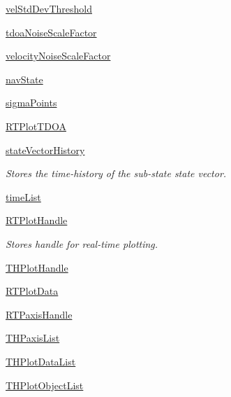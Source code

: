 \begin{DoxyCompactItemize}
\hyperlink{classmodest_1_1substates_1_1correlationvector_1_1CorrelationVector_a2a0c78f9d00f305e6143fb8fbf73fc2f}{vel\+Std\+Dev\+Threshold}
\item 
\hyperlink{classmodest_1_1substates_1_1correlationvector_1_1CorrelationVector_a733786d20ee5e03a7c28420b5db01dcb}{tdoa\+Noise\+Scale\+Factor}
\item 
\hyperlink{classmodest_1_1substates_1_1correlationvector_1_1CorrelationVector_a9f6b81403f3e0c73de3b5b721ca673e5}{velocity\+Noise\+Scale\+Factor}
\item 
\hyperlink{classmodest_1_1substates_1_1correlationvector_1_1CorrelationVector_a29c9276a6e6569fc4a48270f05138148}{nav\+State}
\item 
\hyperlink{classmodest_1_1substates_1_1correlationvector_1_1CorrelationVector_a9f152d079f5c60b8033c9c83e6f2174b}{sigma\+Points}
\item 
\hyperlink{classmodest_1_1substates_1_1correlationvector_1_1CorrelationVector_a331ea1c4d9514da5ebf40f71e7848129}{R\+T\+Plot\+T\+D\+OA}
\item 
\hyperlink{classmodest_1_1substates_1_1substate_1_1SubState_a38c12c9d0899bc1161f3502b584517a2}{state\+Vector\+History}
\begin{DoxyCompactList}\small\item\em Stores the time-\/history of the sub-\/state state vector. \end{DoxyCompactList}\item 
\hyperlink{classmodest_1_1substates_1_1substate_1_1SubState_a9b7a77e3b7dc14fc85962cda84e8cd58}{time\+List}
\item 
\hyperlink{classmodest_1_1substates_1_1substate_1_1SubState_a37ded775b84cea85b4dce0f1b16286c4}{R\+T\+Plot\+Handle}
\begin{DoxyCompactList}\small\item\em Stores handle for real-\/time plotting. \end{DoxyCompactList}\item 
\hyperlink{classmodest_1_1substates_1_1substate_1_1SubState_af1d5d3bbdf73cf1e78925c835f1c616e}{T\+H\+Plot\+Handle}
\item 
\hyperlink{classmodest_1_1substates_1_1substate_1_1SubState_a9fefae1facc797a1132fb61a55e9ffa1}{R\+T\+Plot\+Data}
\item 
\hyperlink{classmodest_1_1substates_1_1substate_1_1SubState_a497ccbb6658589b02568e87c6382222e}{R\+T\+Paxis\+Handle}
\item 
\hyperlink{classmodest_1_1substates_1_1substate_1_1SubState_a22c12497c37f47d54d4ea909f6423222}{T\+H\+Paxis\+List}
\item 
\hyperlink{classmodest_1_1substates_1_1substate_1_1SubState_a0e1d545f7ede186d89db38ca613633cf}{T\+H\+Plot\+Data\+List}
\item 
\hyperlink{classmodest_1_1substates_1_1substate_1_1SubState_a9659535520a27090d79be1957ecce2eb}{T\+H\+Plot\+Object\+List}
\end{DoxyCompactItemize}
